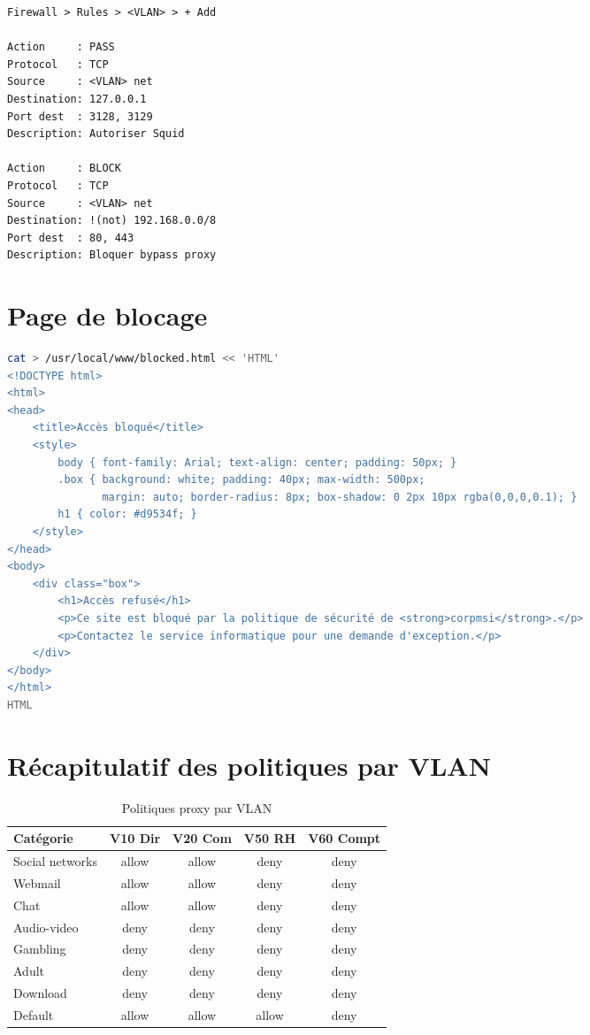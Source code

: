 \begin{lstlisting}
Firewall > Rules > <VLAN> > + Add

Action     : PASS
Protocol   : TCP
Source     : <VLAN> net
Destination: 127.0.0.1
Port dest  : 3128, 3129
Description: Autoriser Squid

Action     : BLOCK
Protocol   : TCP
Source     : <VLAN> net
Destination: !(not) 192.168.0.0/8
Port dest  : 80, 443
Description: Bloquer bypass proxy
\end{lstlisting}

\section{Page de blocage}

\begin{lstlisting}[language=bash]
cat > /usr/local/www/blocked.html << 'HTML'
<!DOCTYPE html>
<html>
<head>
    <title>Accès bloqué</title>
    <style>
        body { font-family: Arial; text-align: center; padding: 50px; }
        .box { background: white; padding: 40px; max-width: 500px;
               margin: auto; border-radius: 8px; box-shadow: 0 2px 10px rgba(0,0,0,0.1); }
        h1 { color: #d9534f; }
    </style>
</head>
<body>
    <div class="box">
        <h1>Accès refusé</h1>
        <p>Ce site est bloqué par la politique de sécurité de <strong>corpmsi</strong>.</p>
        <p>Contactez le service informatique pour une demande d'exception.</p>
    </div>
</body>
</html>
HTML
\end{lstlisting}

\section{Récapitulatif des politiques par VLAN}

\begin{table}[H]
    \centering
    \begin{tabularx}{\textwidth}{|l|c|c|c|c|}
        \hline
        \textbf{Catégorie} & \textbf{V10 Dir} & \textbf{V20 Com} & \textbf{V50 RH} & \textbf{V60 Compt} \\
        \hline
        Social networks & allow & allow & deny & deny \\
        \hline
        Webmail & allow & allow & deny & deny \\
        \hline
        Chat & allow & allow & deny & deny \\
        \hline
        Audio-video & deny & deny & deny & deny \\
        \hline
        Gambling & deny & deny & deny & deny \\
        \hline
        Adult & deny & deny & deny & deny \\
        \hline
        Download & deny & deny & deny & deny \\
        \hline
        Default & allow & allow & allow & deny \\
        \hline
    \end{tabularx}
    \caption{Politiques proxy par VLAN}
    \label{tab:proxy-policies}
\end{table}

